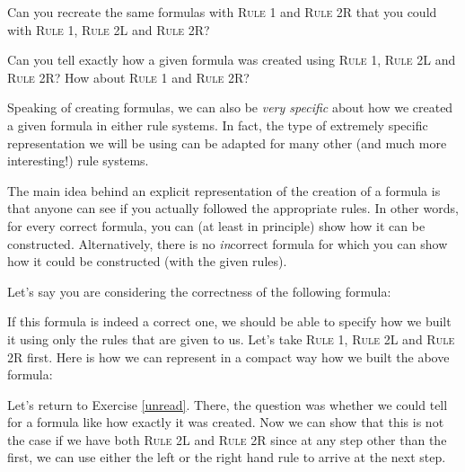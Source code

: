 \begin{exc}
Can you recreate the same formulas with \textsc{Rule 1} and \textsc{Rule 2R} that you could with \textsc{Rule 1}, \textsc{Rule 2L} and \textsc{Rule 2R}?
\end{exc}

\begin{exc}\label{unread}
Can you tell exactly how a given formula was created using \textsc{Rule 1}, \textsc{Rule 2L} and \textsc{Rule 2R}? How about \textsc{Rule 1} and \textsc{Rule 2R}?
\end{exc}

Speaking of creating formulas, we can also be \textit{very specific} about how we created a given formula in either rule systems. In fact, the type of extremely specific representation we will be using can be adapted for many other (and much more interesting!) rule systems. 

The main idea behind an explicit representation of the creation of a formula is that anyone can see if you actually followed the appropriate rules. In other words, for every correct formula, you can (at least in principle) show how it can be constructed. Alternatively, there is no \textit{in}correct formula for which you can show how it could be constructed (with the given rules). 

Let's say you are considering the correctness of the following formula: \begin{center}\bcirc\bcirc\bcirc\bcirc
\end{center}

If this formula is indeed a correct one, we should be able to specify how we built it using only the rules that are given to us. Let's take \textsc{Rule 1}, \textsc{Rule 2L} and \textsc{Rule 2R} first. Here is how we can represent in a compact way how we built the above formula:

\medskip
\begin{axiomatic}
\end{axiomatic}
\medskip

Let's return to Exercise \ref{unread}. There, the question was whether we could tell for a formula like \bcirc\bcirc\bcirc\bcirc{} how exactly it was created. Now we can show that this is not the case if we have both \textsc{Rule 2L} and \textsc{Rule 2R} since at any step other than the first, we can use either the left or the right hand rule to arrive at the next step.

